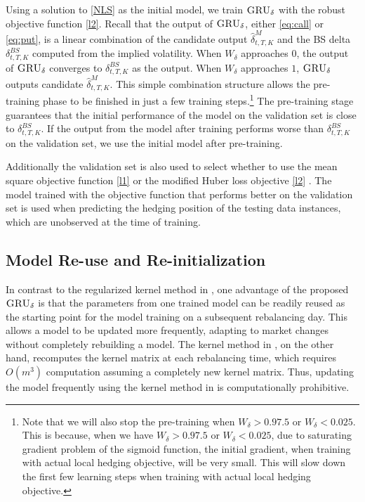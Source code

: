 \documentclass[letterpaper,12pt,titlepage,oneside,final]{book}
\numberwithin{equation}{section}
\theoremstyle{definition}
\newcommand{\model}{\textsc{GRU}_\delta}
\begin{document}
Using a solution to \eqref{NLS} as the initial model, we train $\model$ with the robust objective function \eqref{l2}. Recall that the  output of  $\model$, either \eqref{eq:call} or \eqref{eq:put}, is a linear combination of the candidate output $\widehat{\delta}^M_{t,T,K}$ and the BS delta $\delta^{BS}_{t,T,K}$ computed from the implied volatility. When $W_{\delta}$ approaches 0, the  output of  $\model$ converges to $\delta^{BS}_{t,T,K}$ as the output. When  $W_{\delta}$ approaches $1$,   $\model$ outputs  candidate $\widehat{\delta}^M_{t,T,K}$.
This simple combination structure allows the pre-training phase to be finished in just a few training steps.\footnote{Note that we will also stop the pre-training when $W_{\delta}>0.97.5$ or $W_{\delta}<0.025$. This is because, when we have $W_{\delta}>0.97.5$ or $W_{\delta}<0.025$, due to saturating gradient problem of the sigmoid function, the initial gradient, when training with actual local hedging objective,  will be very small. This will slow down the first few  learning steps when training with actual local hedging objective.}
The pre-training stage guarantees that the initial performance of the model on the validation set is close to $\delta^{BS}_{t,T,K}$. If the output from the model after training performs worse than $\delta^{BS}_{t,T,K}$ on the validation set, we use the initial model after pre-training.


Additionally  the validation set is also used to select  whether to use the mean square objective function \eqref{l1} or  the modified Huber loss objective \eqref{l2} . The model trained with the objective function that performs better on the validation set is used when predicting the hedging position of the testing data instances, which are unobserved at the time of training.


\subsection{Model Re-use and  Re-initialization}\label{sec:reuse}
In contrast to the regularized kernel method in \citep{knian2017},  one advantage of the proposed $\model$ is
that the parameters from one trained model can be readily reused as the starting point for the model training on a subsequent rebalancing day.
This allows a model to be updated more frequently, adapting to market changes without completely rebuilding a model.
The kernel method in \citep{knian2017}, on the other hand,  recomputes the kernel matrix at each rebalancing time, which requires $O(m^3)$ computation assuming a completely new kernel matrix. Thus, updating the model frequently using the kernel method in \citep{knian2017} is computationally prohibitive.
\end{document}
